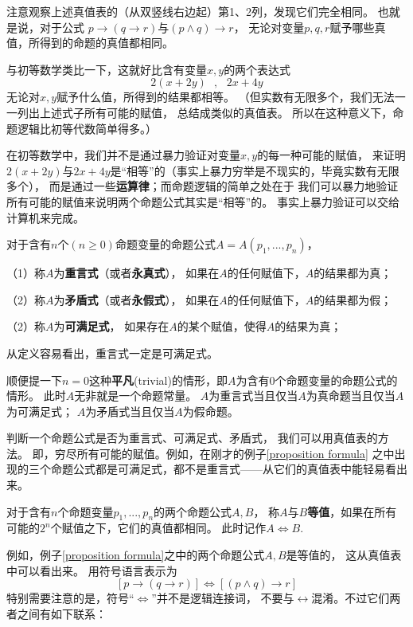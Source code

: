 注意观察上述真值表的（从双竖线右边起）第1、2列，发现它们完全相同。
也就是说，对于公式
$p\rightarrow (q\rightarrow r)$与$(p\wedge q)\rightarrow r$，
无论对变量$p,q,r$赋予哪些真值，所得到的命题的真值都相同。

与初等数学类比一下，这就好比含有变量$x,y$的两个表达式
$$2(x+2y)\,\,\,\,,\,\,\,\,2x+4y$$
无论对$x,y$赋予什么值，所得到的结果都相等。
（但实数有无限多个，我们无法一一列出上述式子所有可能的赋值，
总结成类似的真值表。
所以在这种意义下，命题逻辑比初等代数简单得多。）\vs

在初等数学中，我们并不是通过暴力验证对变量$x,y$的每一种可能的赋值，
来证明$2(x+2y)$与$2x+4y$是“相等”的（事实上暴力穷举是不现实的，毕竟实数有无限多个），
而是通过一些\textbf{运算律}；而命题逻辑的简单之处在于
我们可以暴力地验证所有可能的赋值来说明两个命题公式其实是“相等”的。
事实上暴力验证可以交给计算机来完成。

\begin{definition}[命题公式的分类]
对于含有$n$个$(n\geq0)$命题变量的命题公式$A=A(p_1,...,p_n)$，

（1）称$A$为\textbf{重言式}（或者\textbf{永真式}），
如果在$A$的任何赋值下，$A$的结果都为真；

（2）称$A$为\textbf{矛盾式}（或者\textbf{永假式}），
如果在$A$的任何赋值下，$A$的结果都为假；

（2）称$A$为\textbf{可满足式}，
如果存在$A$的某个赋值，使得$A$的结果为真；
\end{definition}

从定义容易看出，重言式一定是可满足式。

顺便提一下$n=0$这种\textbf{平凡}(trivial)的情形，即$A$为含有0个命题变量的命题公式的情形。
此时$A$无非就是一个命题常量。
$A$为重言式当且仅当$A$为真命题当且仅当$A$为可满足式；
$A$为矛盾式当且仅当$A$为假命题。\vs

判断一个命题公式是否为重言式、可满足式、矛盾式，
我们可以用真值表的方法。
即，穷尽所有可能的赋值。例如，在刚才的例子\ref{proposition formula}
之中出现的三个命题公式都是可满足式，都不是重言式——从它们的真值表中能轻易看出来。

\begin{definition}[命题公式的等值]
对于含有$n$个命题变量$p_1,...,p_n$的两个命题公式$A,B$，
称$A$与$B$\textbf{等值}，如果在所有可能的$2^n$个赋值之下，它们的真值都相同。
此时记作$A\Leftrightarrow B$.
\end{definition}
例如，例子\ref{proposition formula}之中的两个命题公式$A,B$是等值的，
这从真值表中可以看出来。
用符号语言表示为
$$[p\rightarrow (q\rightarrow r)]
\Leftrightarrow [(p\wedge q)\rightarrow r]$$
特别需要注意的是，符号“$\Leftrightarrow$”并不是逻辑连接词，
不要与$\leftrightarrow$混淆。不过它们两者之间有如下联系：

